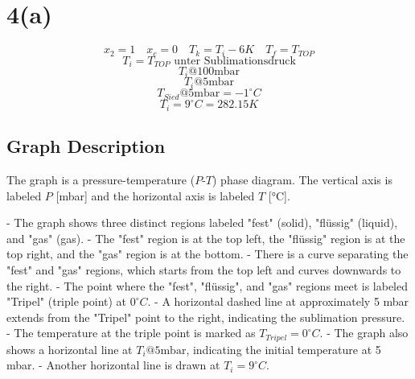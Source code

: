 \section*{4(a)}

\[ x_2 = 1 \quad x_c = 0 \quad T_k = T_i - 6K \quad T_f = T_{TOP} \]
\[ T_i = T_{TOP} \text{ unter Sublimationsdruck} \]
\[ T_i @ 100 \text{mbar} \]
\[ T_i @ 5 \text{mbar} \]
\[ T_{Sied} @ 5 \text{mbar} = -1^\circ C \]
\[ T_i = 9^\circ C = 282.15K \]

\subsection*{Graph Description}

The graph is a pressure-temperature ($P$-$T$) phase diagram. The vertical axis is labeled $P$ [mbar] and the horizontal axis is labeled $T$ [°C]. 

- The graph shows three distinct regions labeled "fest" (solid), "flüssig" (liquid), and "gas" (gas).
- The "fest" region is at the top left, the "flüssig" region is at the top right, and the "gas" region is at the bottom.
- There is a curve separating the "fest" and "gas" regions, which starts from the top left and curves downwards to the right.
- The point where the "fest", "flüssig", and "gas" regions meet is labeled "Tripel" (triple point) at $0^\circ C$.
- A horizontal dashed line at approximately 5 mbar extends from the "Tripel" point to the right, indicating the sublimation pressure.
- The temperature at the triple point is marked as $T_{Tripel} = 0^\circ C$.
- The graph also shows a horizontal line at $T_i @ 5 \text{mbar}$, indicating the initial temperature at 5 mbar.
- Another horizontal line is drawn at $T_i = 9^\circ C$.